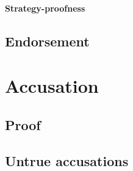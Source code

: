 \paragraph{Strategy-proofness}
\subsection{Endorsement}

\section{Accusation}
\subsection{Proof}
\subsection{Untrue accusations}
